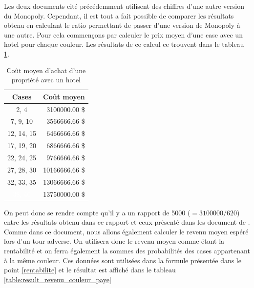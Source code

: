 \documentclass[letterpaper]{article}
\begin{document}
    
    
    Les deux documents cité précédemment utilisent
    des chiffres d'une autre version du Monopoly.  Cependant, il est
    tout a fait possible de comparer les résultats obtenu en calculant
    le ratio permettant de passer d'une version de Monopoly à une autre.
    Pour cela commençons par calculer le prix moyen d'une case avec un
    hotel pour chaque couleur.  Les résultats de ce calcul ce trouvent
    dans le tableau \ref{table:result_cout_couleur}.
    
    \begin{table}
      \centering
      \begin{tabular}{|c|r|}
      \hline
      \multicolumn{1}{|c|}{\textbf{Cases}} &
      \multicolumn{1}{c|}{\textbf{Coût moyen}} \\ \hline
      \cellcolor[HTML]{A0522D} 2, 4 & 3100000.00 \$ \\ \hline
      \cellcolor[HTML]{1E90FF} 7, 9, 10 & 3566666.66 \$ \\ \hline
      \cellcolor[HTML]{FF69B4} 12, 14, 15 & 6466666.66 \$ \\ \hline
      \cellcolor[HTML]{FF8C00} 17, 19, 20 & 6866666.66 \$ \\ \hline
      \cellcolor[HTML]{FF4500} 22, 24, 25 & 9766666.66 \$ \\ \hline
      \cellcolor[HTML]{FFD700} 27, 28, 30 & 10166666.66 \$ \\ \hline
      \cellcolor[HTML]{2E8B57} 32, 33, 35 & 13066666.66 \$ \\ \hline
      \cellcolor[HTML]{483D8B} \textcolor{white}{38, 40} & 13750000.00 \$ \\ \hline
      \end{tabular}
      \caption{Coût moyen d'achat d'une propriété avec un hotel}
      \label{table:result_cout_couleur}
    \end{table}
    
    On peut donc se rendre compte qu'il y a un rapport de 5000 
    ($= 3100000 / 620$) entre les résultats obtenu dans ce 
    rapport et ceux présenté dans les document de \cite{PP_MONOPOLY}.
    Comme dans ce document, nous allons également calculer le 
    revenu moyen espéré lors d'un tour adverse.  On utilisera
    donc le revenu moyen comme étant la rentabilité et on ferra
    également la sommes des probabilités des cases appartenant 
    à la même couleur. Ces données sont utilisées dans la 
    formule présentée dans le point \ref{rentabilite} et le résultat
    est affiché dans le tableau \ref{table:result_revenu_couleur_paye}
    
\end{document}
